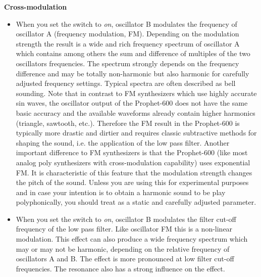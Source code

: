 \textbf{Cross-modulation}

\begin{itemize}
  \item When you set the \polymodfreq switch to \textit{on}, oscillator B modulates the frequency of oscillator A (frequency modulation, FM). Depending on the modulation strength the result is a wide and rich frequency spectrum of oscillator A which contains among others the sum and difference of multiples of the two oscillators frequencies. The spectrum strongly depends on the frequency difference and may be totally non-harmonic but also harmonic for carefully adjusted frequency settings. Typical spectra are often described as bell sounding. Note that in contrast to FM synthesizers which use highly accurate sin waves, the oscillator output of the Prophet-600 does not have the same basic accuracy and the available waveforms already contain higher harmonics (triangle, sawtooth, etc.). Therefore the FM result in the Prophet-600 is typically more drastic and dirtier and requires classic subtractive methods for shaping the sound, i.e. the application of the low pass filter. Another important difference to FM synthesizers is that the Prophet-600 (like most analog poly synthesizers with cross-modulation capability) uses exponential FM. It is characteristic of this feature that the modulation strength changes the pitch of the sound. Unless you are using this for experimental purposes and in case your intention is to obtain a harmonic sound to be play polyphonically, you should treat \polymodosc as a static and carefully adjusted parameter.
  \item When you set the \polymodfilter switch to \textit{on}, oscillator B modulates the filter cut-off frequency of the low pass filter. Like oscillator FM this is a non-linear modulation. This effect can also produce a wide frequency spectrum which may or may not be harmonic, depending on the relative frequency of oscillators A and B. The effect is more pronounced at low filter cut-off frequencies. The resonance also has a strong influence on the effect.  
\end{itemize}


